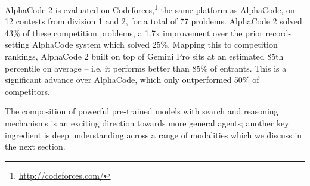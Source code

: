 AlphaCode 2 is evaluated on Codeforces,\footnote{\url{http://codeforces.com/}} the same platform as AlphaCode, on 12 contests from division 1 and 2, for a total of 77 problems. AlphaCode 2 solved 43\% of these competition problems, a 1.7x improvement over the prior record-setting AlphaCode system which solved 25\%. Mapping this to competition rankings, AlphaCode 2 built on top of Gemini Pro sits at an estimated 85th percentile on average – i.e. it performs better than 85\% of entrants. This is a significant advance over AlphaCode, which only outperformed 50\% of competitors.

The composition of powerful pre-trained models with search and reasoning mechanisms is an exciting direction towards more general agents; another key ingredient is deep understanding across a range of modalities which we discuss in the next section. 
